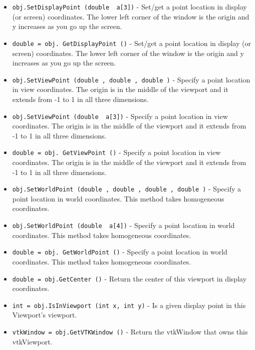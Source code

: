 \begin{itemize}
\item  \verb|obj.SetDisplayPoint (double  a[3])| -  Set/get a point location in display (or screen) coordinates.
 The lower left corner of the window is the origin and y increases
 as you go up the screen.

\item  \verb|double = obj. GetDisplayPoint ()| -  Set/get a point location in display (or screen) coordinates.
 The lower left corner of the window is the origin and y increases
 as you go up the screen.

\item  \verb|obj.SetViewPoint (double , double , double )| -  Specify a point location in view coordinates. The origin is in the
 middle of the viewport and it extends from -1 to 1 in all three
 dimensions.

\item  \verb|obj.SetViewPoint (double  a[3])| -  Specify a point location in view coordinates. The origin is in the
 middle of the viewport and it extends from -1 to 1 in all three
 dimensions.

\item  \verb|double = obj. GetViewPoint ()| -  Specify a point location in view coordinates. The origin is in the
 middle of the viewport and it extends from -1 to 1 in all three
 dimensions.

\item  \verb|obj.SetWorldPoint (double , double , double , double )| -  Specify a point location in world coordinates. This method takes
 homogeneous coordinates.

\item  \verb|obj.SetWorldPoint (double  a[4])| -  Specify a point location in world coordinates. This method takes
 homogeneous coordinates.

\item  \verb|double = obj. GetWorldPoint ()| -  Specify a point location in world coordinates. This method takes
 homogeneous coordinates.

\item  \verb|double = obj.GetCenter ()| -  Return the center of this viewport in display coordinates.

\item  \verb|int = obj.IsInViewport (int x, int y)| -  Is a given display point in this Viewport's viewport.

\item  \verb|vtkWindow = obj.GetVTKWindow ()| -  Return the vtkWindow that owns this vtkViewport.


\end{itemize}
